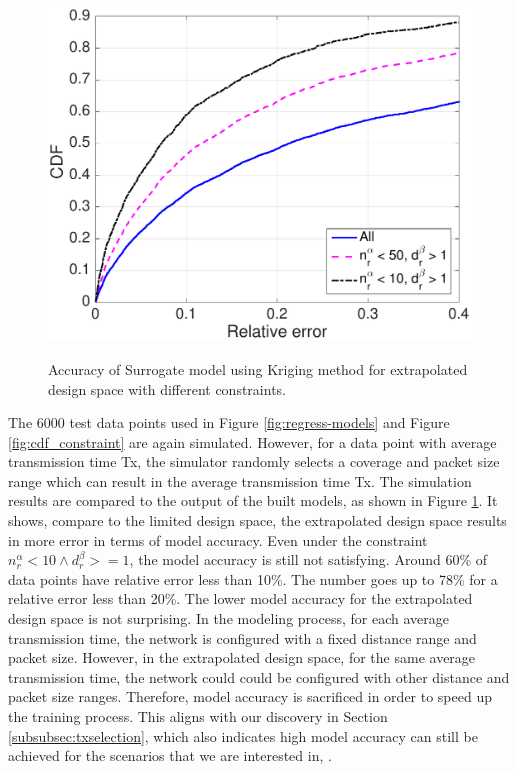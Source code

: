  
 \begin{figure}[t]
    \centering
{\includegraphics[width=0.8\columnwidth]{figures/Extend_constraint}}
  \caption{Accuracy of Surrogate model using Kriging method for extrapolated design space with different constraints. \label{fig:cdf_constraint_extended}}
\end{figure}
 
The 6000 test data points used in Figure \ref{fig:regress-models} and Figure \ref{fig:cdf_constraint} are again simulated. However, for a data point with average transmission time Tx, the simulator randomly selects a  coverage and packet size range which can result in the average transmission time Tx. The simulation results are compared to the output of the built models, as shown in Figure \ref{fig:cdf_constraint_extended}. It shows, compare to the limited design space, the extrapolated design space results in more error in terms of model accuracy. Even under the constraint $n^{\alpha}_r < 10 \wedge d^{\beta}_r >= 1$, the model accuracy is still not satisfying. Around 60\% of data points have relative error less than 10\%. The number goes up to 78\% for a relative error less than 20\%. The lower model accuracy for the extrapolated design space is not surprising. In the modeling process, for each average transmission time, the network is configured with a fixed distance range and packet size. However, in the extrapolated design space, for the same average transmission time, the network could could be configured with other distance  and packet size ranges. Therefore, model accuracy is sacrificed in order to speed up the training process. This aligns with our discovery in Section \ref{subsubsec:txselection}, which also indicates high model accuracy can still be achieved for the scenarios that we are interested in, . 
 
